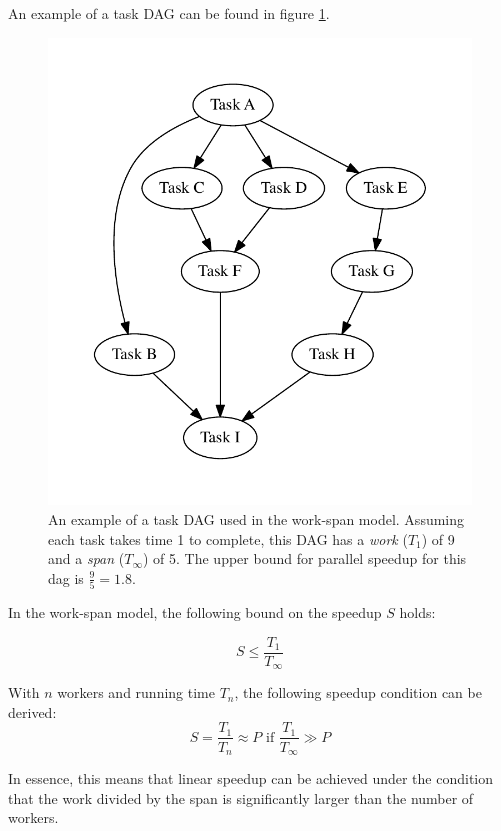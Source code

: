An example of a task DAG can be found in figure \ref{fig:dag_example}.

\begin{figure}[ht]
  \centering
  \includegraphics[width=120mm]{figures/task_dag_example.pdf}
  \caption[Example of work-span model task DAG]{An example of a task DAG used in the work-span model. Assuming each task takes
    time 1 to complete, this DAG has a \textit{work} ($T_1$) of 9 and a \textit{span} ($T_\infty$) of 5. The upper bound for
    parallel speedup for this dag is $\frac{9}{5} = 1.8$.}
  \label{fig:dag_example}
\end{figure}

In the work-span model, the following bound on the speedup $S$ holds:

\begin{displaymath}
  S \leq \frac{T_1}{T_\infty}
\end{displaymath}

With $n$ workers and running time $T_n$, the following speedup condition can be derived:
\begin{displaymath}
  S = \frac{T_1}{T_n} \approx P \text{ if } \frac{T_1}{T_\infty} \gg P
\end{displaymath}

In essence, this means that linear speedup can be achieved under the condition that the work divided by the span is significantly
larger than the number of workers.

